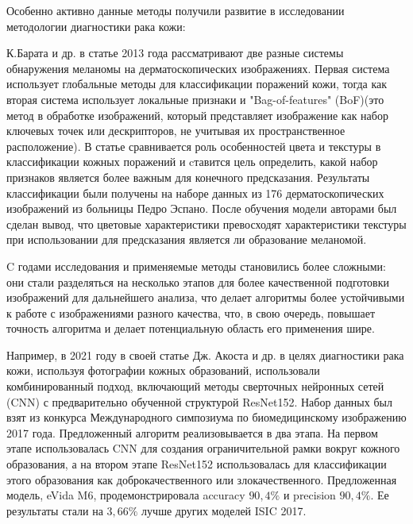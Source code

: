 \documentclass[14pt, a4paper]{extarticle}
\begin{document}
Особенно активно данные методы получили развитие в исследовании методологии диагностики рака кожи:

К.Барата и др. \cite{barata2013two}  в статье 2013 года рассматривают две разные системы обнаружения меланомы на дерматоскопических изображениях. Первая система использует глобальные методы для классификации поражений кожи, тогда как вторая система использует локальные признаки и "Bag-of-features" (BoF)(это метод в обработке изображений, который представляет изображение как набор ключевых точек или дескрипторов, не учитывая их пространственное расположение). В статье сравнивается роль особенностей цвета и текстуры в классификации кожных поражений и cтавится цель определить, какой набор признаков является более важным для конечного предсказания. Результаты классификации были получены на наборе данных из 176 дерматоскопических изображений из больницы Педро Эспано. После обучения модели авторами был сделан вывод, что цветовые характеристики превосходят характеристики текстуры при использовании для предсказания является ли образование меланомой.


C годами исследования и применяемые методы становились более сложными: они стали разделяться на несколько этапов для более качественной подготовки изображений для дальнейшего анализа, что делает алгоритмы более устойчивыми к работе с изображениями разного качества, что, в свою очередь, повышает точность алгоритма и делает потенциальную область его применения шире.

Например, в 2021 году в своей статье Дж. Акоста и др. \cite{jojoa2021melanoma} в целях диагностики рака кожи, используя фотографии кожных образований, использовали комбинированный подход, включающий методы сверточных нейронных сетей (CNN) с предварительно обученной структурой ResNet152. Набор данных был взят из конкурса Международного симпозиума по биомедицинскому изображению 2017 года. 
Предложенный алгоритм реализовывается в два этапа. На первом этапе использовалась CNN для создания ограничительной рамки вокруг кожного образования, а на втором этапе ResNet152 использовалась для классификации этого образования как доброкачественного или злокачественного. Предложенная модель, eVida M6, продемонстрировала accuracy $90,4\%$ и precision $90,4\%$. Ее результаты стали на $3,66\%$ лучше других моделей ISIC 2017.
\end{document}
